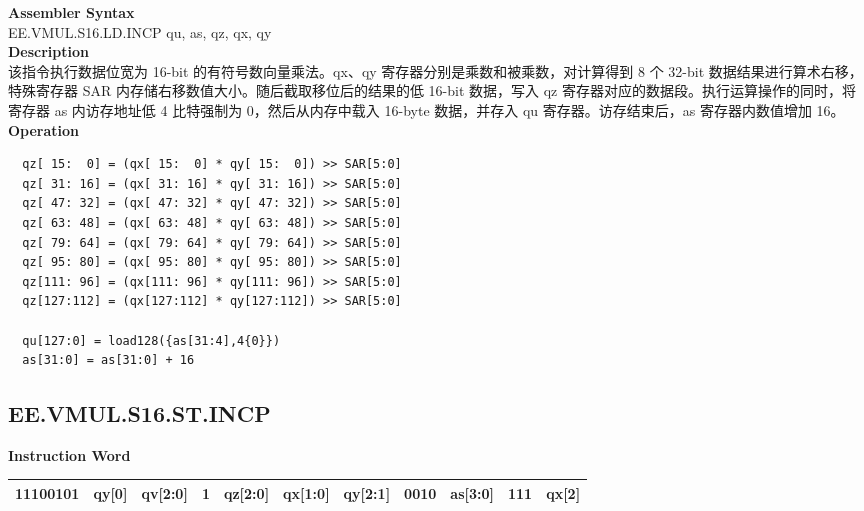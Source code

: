 \textbf{Assembler Syntax} \\
EE.VMUL.S16.LD.INCP qu, as, qz, qx, qy \\
\textbf{Description} \\
该指令执行数据位宽为 16-bit 的有符号数向量乘法。qx、qy 寄存器分别是乘数和被乘数，对计算得到 8 个 32-bit 数据结果进行算术右移，特殊寄存器 SAR 内存储右移数值大小。随后截取移位后的结果的低 16-bit 数据，写入 qz 寄存器对应的数据段。执行运算操作的同时，将寄存器 as 内访存地址低 4 比特强制为 0，然后从内存中载入 16-byte 数据，并存入 qu 寄存器。访存结束后，as 寄存器内数值增加 16。\\
\textbf{Operation}
\begin{lstlisting}
  qz[ 15:  0] = (qx[ 15:  0] * qy[ 15:  0]) >> SAR[5:0]
  qz[ 31: 16] = (qx[ 31: 16] * qy[ 31: 16]) >> SAR[5:0]
  qz[ 47: 32] = (qx[ 47: 32] * qy[ 47: 32]) >> SAR[5:0]
  qz[ 63: 48] = (qx[ 63: 48] * qy[ 63: 48]) >> SAR[5:0]
  qz[ 79: 64] = (qx[ 79: 64] * qy[ 79: 64]) >> SAR[5:0]
  qz[ 95: 80] = (qx[ 95: 80] * qy[ 95: 80]) >> SAR[5:0]
  qz[111: 96] = (qx[111: 96] * qy[111: 96]) >> SAR[5:0]
  qz[127:112] = (qx[127:112] * qy[127:112]) >> SAR[5:0]

  qu[127:0] = load128({as[31:4],4{0}})
  as[31:0] = as[31:0] + 16
\end{lstlisting}

\clearpage
\subsection{EE.VMUL.S16.ST.INCP}\label{instruction:EEVMULS16STINCP}
\setlength\tabcolsep{6pt}
\textbf{Instruction Word} \\
\begin{tabular}{|c|c|c|c|c|c|c|c|c|c|c|}
	\hline
	11100101 & qy[0] & qv[2:0] & 1 & qz[2:0] & qx[1:0] & qy[2:1] & 0010 & as[3:0] & 111 & qx[2] \\
	\hline
\end{tabular}

